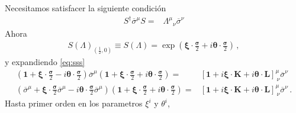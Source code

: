   Necesitamos satisfacer la siguiente condición
\begin{align}
\label{eq:sss}
  S^\dagger\overline{\sigma}^\mu S=&{\Lambda^\mu}_\nu\overline{\sigma}^\nu
\end{align}
Ahora
\begin{align}
\label{eq:SLet}
  S(\Lambda)_{\left( \frac{1}{2},0 \right)}\equiv S(\Lambda)=
\exp\left( \boldsymbol{\xi}\cdot \frac{\boldsymbol{\sigma}}{2}+i\boldsymbol{\theta}\cdot \frac{\boldsymbol{\sigma}}{2} \right)\,,
\end{align}
y expandiendo \eqref{eq:sss}
\begin{align*}
\left(\mathbf{1}+\boldsymbol{\xi}\cdot \frac{\boldsymbol{\sigma}}{2} -i\boldsymbol{\theta}\cdot \frac{\boldsymbol{\sigma}}{2}  \right)
\overline{\sigma}^{\mu}
\left(\mathbf{1}+\boldsymbol{\xi}\cdot \frac{\boldsymbol{\sigma}}{2} +i\boldsymbol{\theta}\cdot \frac{\boldsymbol{\sigma}}{2}  \right)
=&\left[ \mathbf{1}+i\boldsymbol{\xi}\cdot \mathbf{K}+i\boldsymbol{\theta}\cdot \mathbf{L} \right]^{\mu}_{\ \nu}\overline{\sigma}^\nu \nonumber\\
\left(\overline{\sigma}^{\mu}+\boldsymbol{\xi}\cdot \frac{\boldsymbol{\sigma}}{2}\overline{\sigma}^{\mu} -i\boldsymbol{\theta}\cdot \frac{\boldsymbol{\sigma}}{2}\overline{\sigma}^{\mu}  \right)
\left(\mathbf{1}+\boldsymbol{\xi}\cdot \frac{\boldsymbol{\sigma}}{2} +i\boldsymbol{\theta}\cdot \frac{\boldsymbol{\sigma}}{2}  \right)
=&\left[ \mathbf{1}+i\boldsymbol{\xi}\cdot \mathbf{K}+i\boldsymbol{\theta}\cdot \mathbf{L} \right]^{\mu}_{\ \nu}\overline{\sigma}^\nu \,.
\end{align*}
Hasta primer orden en los parametros $\xi^i$ y $\theta^i$,
